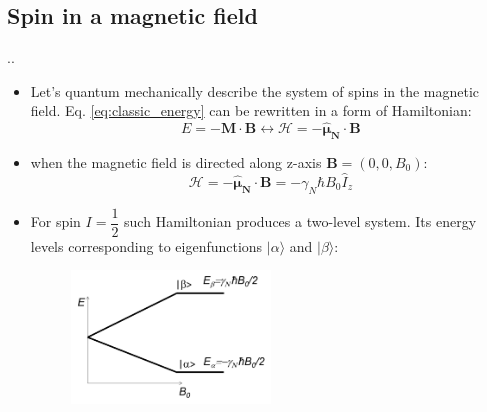 \documentclass[handout]{beamer}
\begin{document}
\subsection{Spin in a magnetic field}
\begin{frame}{\thesection.\thesubsection. \insertsubsection}
		\begin{itemize}[<+>]
		\item Let's quantum mechanically describe the system of spins in the magnetic field. Eq. \ref{eq:classic_energy} can be rewritten in a form of Hamiltonian:
		\begin{equation}
			E = -\bm{M} \cdot \bm{B}  \longleftrightarrow \mathcal{H}= - \bm{\hat{\mu}_N} \cdot \bm{B} 
		\end{equation}
		\item when the magnetic field is directed along z-axis $\bm{B}= (0,0,B_0)$:
		\begin{equation}
		\mathcal{H}= - \bm{\hat{\mu}_N} \cdot \bm{B} = -\gamma_N \hbar B_0 \hat{I}_z
		\end{equation}
		\item For spin $I=\dfrac{1}{2}$ such Hamiltonian produces a two-level system. Its energy levels corresponding to eigenfunctions $\vert \alpha \rangle$ and $\vert \beta \rangle$:
		\begin{figure}
		    \includegraphics[width=0.5\textwidth]{two-level_system.png}
		\end{figure}
		
	\end{itemize}
\end{frame}
\end{document}
